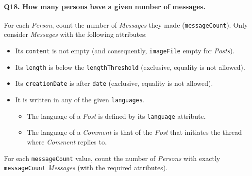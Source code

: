 \paragraph{\textbf{Q18}. How many persons have a given number of messages.}
For each \emph{Person}, count the number of \emph{Messages} they made
(\texttt{messageCount}). Only consider \emph{Messages} with the
following attributes:
\begin{itemize}
\item
  Its \texttt{content} is not empty (and consequently,
  \texttt{imageFile} empty for \emph{Posts}).
\item
  Its \texttt{length} is below the \texttt{lengthThreshold} (exclusive,
  equality is not allowed).
\item
  Its \texttt{creationDate} is after \texttt{date} (exclusive, equality
  is not allowed).
\item
  It is written in any of the given \texttt{languages}.
  \begin{itemize}
  \tightlist
  \item
    The language of a \emph{Post} is defined by its \texttt{language}
    attribute.
  \item
    The language of a \emph{Comment} is that of the \emph{Post} that
    initiates the thread where \emph{Comment} replies to.
  \end{itemize}
\end{itemize}
For each \texttt{messageCount} value, count the number of \emph{Persons}
with exactly \texttt{messageCount} \emph{Messages} (with the required
attributes).
